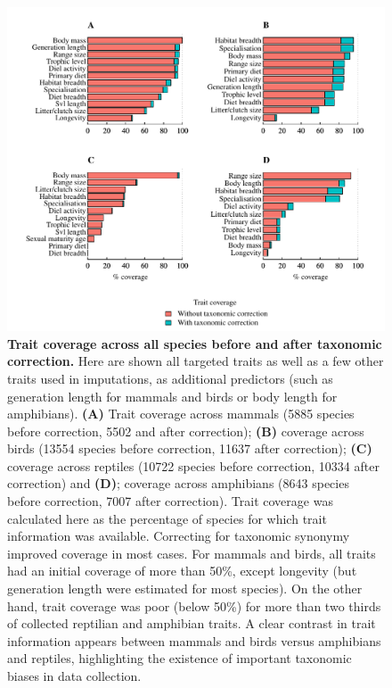 \begin{figure}[h!]
\centering
\includegraphics[scale=0.85]{figures/chapter2/Trait_coverage/Predictor_traits/All_species}
\caption[Trait coverage across all species before and after taxonomic correction]{\textbf{Trait coverage across all species before and after taxonomic correction.} Here are shown all targeted traits as well as a few other traits used in imputations, as additional predictors (such as generation length for mammals and birds or body length for amphibians). \textbf{(A)} Trait coverage across mammals (5885 species before correction, 5502 and after correction); \textbf{(B)} coverage across birds (13554 species before correction, 11637 after correction); \textbf{(C)} coverage across reptiles (10722 species before correction, 10334 after correction) and \textbf{(D)}; coverage across amphibians (8643 species before correction, 7007 after correction). Trait coverage was calculated here as the percentage of species for which trait information was available. Correcting for taxonomic synonymy improved coverage in most cases. For mammals and birds, all traits had an initial coverage of more than 50\%, except longevity (but generation length were estimated for most species). On the other hand, trait coverage was poor (below 50\%) for more than two thirds of collected reptilian and amphibian traits. A clear contrast in trait information appears between mammals and birds versus amphibians and reptiles, highlighting the existence of important taxonomic biases in data collection.}
\label{traitcov}
\end{figure}


